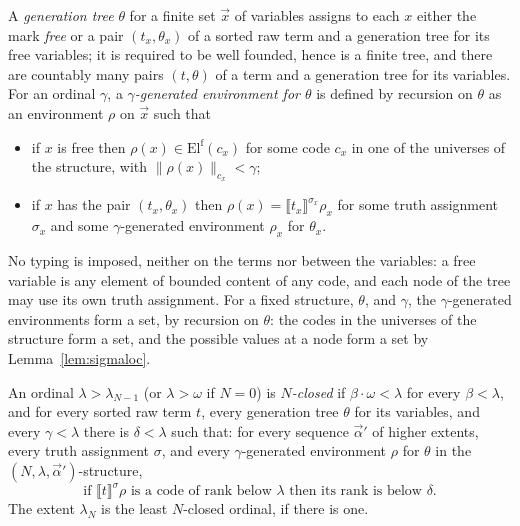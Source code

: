\documentclass[10pt]{article}
\newcommand{\sem}[1]{\llbracket #1\rrbracket}
\newcommand{\El}{\mathrm{El}}
\begin{document}
\begin{definition}\label{def:wenv}
A \emph{generation tree} $\theta$ for a finite set $\vec x$ of variables
assigns to each $x$ either the mark \emph{free} or a pair $(t_x,\theta_x)$
of a sorted raw term and a generation tree for its free variables; it is
required to be well founded, hence is a finite tree, and there are
countably many pairs $(t,\theta)$ of a term and a generation tree for its
variables. For an ordinal $\gamma$, a \emph{$\gamma$-generated environment
for $\theta$} is defined by recursion on $\theta$ as an environment $\rho$
on $\vec x$ such that
\begin{itemize}
\item if $x$ is free then $\rho(x)\in\El^{\mathrm f}(c_x)$ for some code
  $c_x$ in one of the universes of the structure, with
  $\|\rho(x)\|_{c_x}<\gamma$;
\item if $x$ has the pair $(t_x,\theta_x)$ then
  $\rho(x)=\sem{t_x}^{\sigma_x}\rho_x$ for some truth assignment $\sigma_x$
  and some $\gamma$-generated environment $\rho_x$ for $\theta_x$.
\end{itemize}
No typing is imposed, neither on the terms nor between the variables:
a free variable is any element of bounded content of any code, and each
node of the tree may use its own truth assignment. For a fixed structure,
$\theta$, and $\gamma$, the $\gamma$-generated environments form a set, by
recursion on $\theta$: the codes in the universes of the structure form a
set, and the
possible values at a node form a set by Lemma~\ref{lem:sigmaloc}.
\end{definition}

\begin{definition}\label{def:closed}
An ordinal $\lambda>\lambda_{N-1}$ (or $\lambda>\omega$ if $N=0$) is
\emph{$N$-closed} if $\beta\cdot\omega<\lambda$ for every $\beta<\lambda$,
and for every sorted raw term $t$, every generation tree $\theta$ for its
variables, and every $\gamma<\lambda$ there is $\delta<\lambda$ such that:
for every sequence $\vec\alpha'$ of higher extents, every truth assignment
$\sigma$, and every $\gamma$-generated environment $\rho$ for $\theta$ in
the $(N,\lambda,\vec\alpha')$-structure,
\[
\text{if }\sem t^\sigma\rho\text{ is a code of rank below }\lambda
\text{ then its rank is below }\delta.
\]
The extent $\lambda_N$ is the least $N$-closed ordinal, if there is one.
\end{definition}
\end{document}
